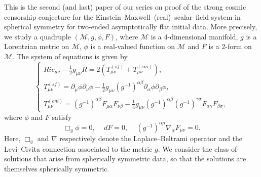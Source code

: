 \documentclass[10pt, reqno]{amsart}
\theoremstyle{definition}
\theoremstyle{remark}
\theoremstyle{conjecture}
\numberwithin{equation}{section}
\newcommand{\rd}{\partial}
\newcommand{\0}{\emptyset}
\newcommand{\alp}{\alpha}
\newcommand{\bt}{\beta}
\newcommand{\f}{\frac}
\newcommand{\nab}{\nabla}
\begin{document}
This is the second (and last) paper of our series on proof of the strong cosmic censorship conjecture 
for the Einstein--Maxwell--(real)--scalar--field system in spherical symmetry for two-ended asymptotically flat initial data. More precisely, we study a quadruple $(\mathcal M,g,\phi,F)$, where $\mathcal M$ is a $4$-dimensional manifold, $g$ is a Lorentzian metric on $\mathcal M$, $\phi$ is a real-valued function on $\mathcal M$ and $F$ is a $2$-form on $\mathcal M$. The system of equations is given by
\begin{equation}\label{EMSFS}
\begin{cases}
Ric_{\mu\nu}-\f12 g_{\mu\nu} R=2(T^{(sf)}_{\mu\nu}+T^{(em)}_{\mu\nu}),\\
T^{(sf)}_{\mu\nu}=\rd_\mu\phi\rd_\nu\phi-\f 12 g_{\mu\nu} (g^{-1})^{\alp\beta}\rd_\alp\phi\rd_{\beta}\phi,\\
T^{(em)}_{\mu\nu}=(g^{-1})^{\alp\bt}F_{\mu\alp}F_{\nu\bt}-\f 14 g_{\mu\nu}(g^{-1})^{\alp\bt}(g^{-1})^{\gamma\sigma}F_{\alp\gamma}F_{\bt\sigma},
\end{cases}
\end{equation}
where $\phi$ and $F$ satisfy
$$\Box_g\phi=0,\,\quad dF=0,\,\quad (g^{-1})^{\alpha\mu}\nab_\alpha F_{\mu\nu}=0.$$
Here, $\Box_g$ and $\nab$ respectively denote the Laplace--Beltrami operator and the Levi--Civita connection associated to the metric $g$. We consider the class of solutions that arise from spherically symmetric data, so that the solutions are themselves spherically symmetric.
\end{document}
